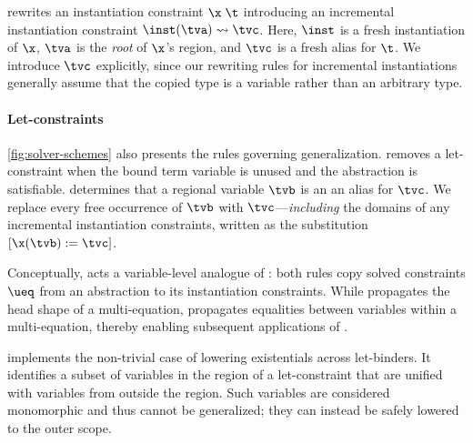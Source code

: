 \documentclass[acmsmall,screen,nonacm%
\Anonymous{,anonymous}{}%
\Final{}{,review}%
]{acmart}
\begin{document}


 rewrites an instantiation constraint $\capp \x \t$ introducing an
incremental instantiation constraint $\cpinst \inst \tv \tvc$. Here, $\inst$ is
a fresh instantiation of $\x$, $\tv$ is the \emph{root} of $\x$'s region, and
$\tvc$ is a fresh alias for $\t$. We introduce $\tvc$ explicitly, since our
rewriting rules for incremental instantiations generally assume that the copied
type is a variable rather than an arbitrary type.



\paragraph{Let-constraints}

\cref{fig:solver-schemes} also presents the rules governing generalization.
%
%
 removes a let-constraint when the bound term
variable is unused and the abstraction is satisfiable. 
determines that a regional variable $\tvb$ is an an alias for $\tvc$. We
replace every free occurrence of $\tvb$ with $\tvc$---\emph{including} the
domains of any incremental instantiation constraints, written as the
substitution $\where{\x(\tvb) \is \tvc}$.

Conceptually,  acts a variable-level analogue of
: both rules copy solved constraints $\ueq$ from an
abstraction to its instantiation constraints. While 
propagates the head shape of a multi-equation,  propagates
equalities between variables within a multi-equation, thereby enabling
subsequent applications of .


 implements the non-trivial case of lowering
existentials across let-binders. It identifies a subset of variables in
the region of a let-constraint that are unified with variables from
outside the region. Such variables are considered monomorphic and thus
cannot be generalized; they can instead be safely lowered to the outer
scope.

\end{document}
